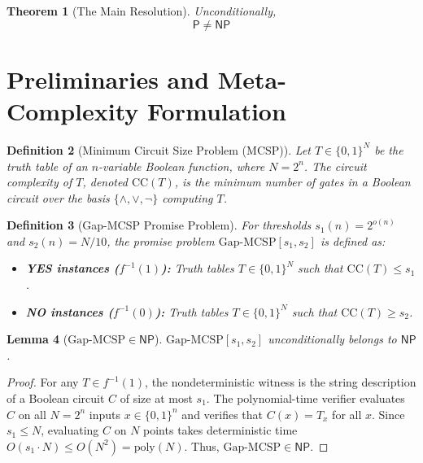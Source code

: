\documentclass[11pt,letterpaper]{article}
\newtheorem{theorem}{Theorem}[section]
\newtheorem{lemma}[theorem]{Lemma}
\newtheorem{definition}[theorem]{Definition}
\newcommand{\NP}{\mathsf{NP}}
\renewcommand{\P}{\mathsf{P}}
\newcommand{\MCSP}{\mathrm{MCSP}}
\newcommand{\GapMCSP}{\mathrm{Gap\text{-}MCSP}}
\newcommand{\poly}{\mathrm{poly}}
\begin{document}
\begin{theorem}[The Main Resolution]
\label{thm:intro_p_np}
Unconditionally,
\[
\P \neq \NP
\]
\end{theorem}

\section{Preliminaries and Meta-Complexity Formulation}

\begin{definition}[Minimum Circuit Size Problem ($\MCSP$)]
Let $T \in \{0,1\}^N$ be the truth table of an $n$-variable Boolean function, where $N = 2^n$. The circuit complexity of $T$, denoted $\mathrm{CC}(T)$, is the minimum number of gates in a Boolean circuit over the basis $\{\land, \lor, \neg\}$ computing $T$.
\end{definition}

\begin{definition}[Gap-MCSP Promise Problem]
For thresholds $s_1(n) = 2^{o(n)}$ and $s_2(n) = N / 10$, the promise problem $\GapMCSP[s_1, s_2]$ is defined as:
\begin{itemize}
    \item \textbf{YES instances ($f^{-1}(1)$):} Truth tables $T \in \{0,1\}^N$ such that $\mathrm{CC}(T) \le s_1$.
    \item \textbf{NO instances ($f^{-1}(0)$):} Truth tables $T \in \{0,1\}^N$ such that $\mathrm{CC}(T) \ge s_2$.
\end{itemize}
\end{definition}

\begin{lemma}[$\GapMCSP \in \NP$]
\label{lem:gap_mcsp_in_np}
$\GapMCSP[s_1, s_2]$ unconditionally belongs to $\NP$.
\end{lemma}

\begin{proof}
For any $T \in f^{-1}(1)$, the nondeterministic witness is the string description of a Boolean circuit $C$ of size at most $s_1$. The polynomial-time verifier evaluates $C$ on all $N = 2^n$ inputs $x \in \{0,1\}^n$ and verifies that $C(x) = T_x$ for all $x$. Since $s_1 \le N$, evaluating $C$ on $N$ points takes deterministic time $O(s_1 \cdot N) \le O(N^2) = \poly(N)$. Thus, $\GapMCSP \in \NP$.
\end{proof}
\end{document}
